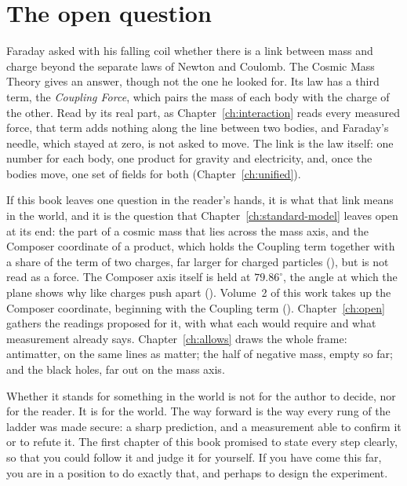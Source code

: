 \section*{The open question}
{}

Faraday asked with his falling coil whether there is a link between mass and charge beyond the separate laws of Newton and Coulomb. The Cosmic Mass Theory gives an answer, though not the one he looked for. Its law has a third term, the \emph{Coupling Force}, which pairs the mass of each body with the charge of the other. Read by its real part, as Chapter~\ref{ch:interaction} reads every measured force, that term adds nothing along the line between two bodies, and Faraday's needle, which stayed at zero, is not asked to move. The link is the law itself: one number for each body, one product for gravity and electricity, and, once the bodies move, one set of fields for both (Chapter~\ref{ch:unified}).

If this book leaves one question in the reader's hands, it is what that link means in the world, and it is the question that Chapter~\ref{ch:standard-model} leaves open at its end: the part of a cosmic mass that lies across the mass axis, and the Composer coordinate of a product, which holds the Coupling term together with a share of the term of two charges, far larger for charged particles (), but is not read as a force. The Composer axis itself is held at $79.86^\circ$, the angle at which the plane shows why like charges push apart (). Volume~2 of this work takes up the Composer coordinate, beginning with the Coupling term (). Chapter~\ref{ch:open} gathers the readings proposed for it, with what each would require and what measurement already says. Chapter~\ref{ch:allows} draws the whole frame: antimatter, on the same lines as matter; the half of negative mass, empty so far; and the black holes, far out on the mass axis.

Whether it stands for something in the world is not for the author to decide, nor for the reader. It is for the world. The way forward is the way every rung of the ladder was made secure: a sharp prediction, and a measurement able to confirm it or to refute it. The first chapter of this book promised to state every step clearly, so that you could follow it and judge it for yourself. If you have come this far, you are in a position to do exactly that, and perhaps to design the experiment.

